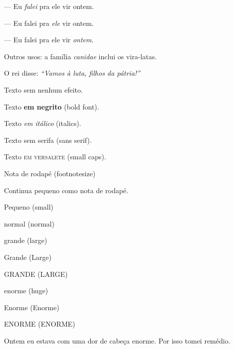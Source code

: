 \documentclass[12pt]{memoir}
\begin{document}
--- Eu \emph{falei} pra ele vir ontem.

--- Eu falei pra \emph{ele} vir ontem.

--- Eu falei pra ele vir \emph{ontem}.


Outros usos: a família \emph{canidae} inclui
os vira-latas.

O rei disse: \emph{``Vamos à \emph{luta}, filhos da pátria!''}




Texto         sem nenhum efeito.

Texto \textbf{em negrito} (bold font).

Texto \textit{em itálico} (italics).

Texto \textsf{sem serifa} (sans serif).

Texto \textsc{em versalete} (small caps).



\newpage

{
\footnotesize 

Nota de rodapé (footnotesize)


Continua pequeno como nota de rodapé.

\small Pequeno (small)

\normalsize normal (normal)

\large grande (large)

\Large Grande (Large)

\LARGE GRANDE (LARGE)

\huge enorme (huge)

\Huge Enorme (Enorme)

\HUGE ENORME (ENORME)

}

Ontem eu estava com uma dor de cabeça
{\huge enorme}. 
Por isso tomei remédio.
\end{document}
